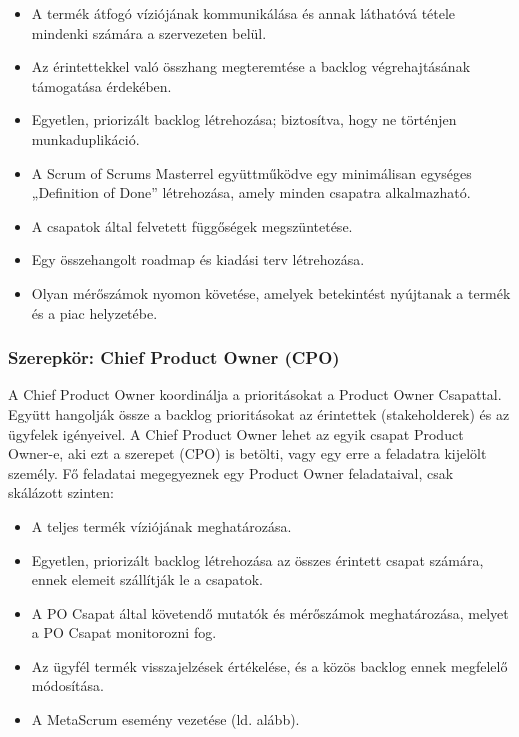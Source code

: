 \documentclass[12pt,a4paper,parskip=full]{scrartcl}
\begin{document}
\begin{itemize}
\itemsep1pt\parskip0pt
\item
 A termék átfogó víziójának kommunikálása és annak láthatóvá tétele mindenki számára a szervezeten belül.
\item
 Az érintettekkel való összhang megteremtése a backlog végrehajtásának támogatása érdekében.
\item
 Egyetlen, priorizált backlog létrehozása; biztosítva, hogy ne történjen munkaduplikáció.
\item
A Scrum of Scrums Masterrel együttműködve egy minimálisan egységes „Definition of Done” létrehozása, amely minden csapatra alkalmazható.
\item
 A csapatok által felvetett függőségek megszüntetése.
\item
 Egy összehangolt roadmap és kiadási terv létrehozása.
\item
 Olyan mérőszámok nyomon követése, amelyek betekintést nyújtanak a termék és a piac helyzetébe.
\end{itemize}

\subsubsection{Szerepkör: Chief Product Owner (CPO)}\label{role-the-chief-product-owner}

A Chief Product Owner koordinálja a prioritásokat a Product Owner Csapattal. Együtt hangolják össze a backlog prioritásokat az érintettek (stakeholderek) és az ügyfelek igényeivel. A Chief Product Owner lehet az egyik csapat Product Owner-e, aki ezt a szerepet (CPO) is betölti, vagy egy erre a feladatra kijelölt személy. Fő feladatai megegyeznek egy Product Owner feladataival, csak skálázott szinten:

\begin{itemize}
\itemsep1pt\parskip0pt
\item
 A teljes termék víziójának meghatározása.
\item
 Egyetlen, priorizált backlog létrehozása az összes érintett csapat számára, ennek elemeit szállítják le a csapatok.
\item
 A PO Csapat által követendő mutatók és mérőszámok meghatározása, melyet a PO Csapat monitorozni fog.
\item
Az ügyfél termék visszajelzések értékelése, és a közös backlog ennek megfelelő módosítása.
\item
 A MetaScrum esemény vezetése (ld. alább).
\end{itemize}
\end{document}
